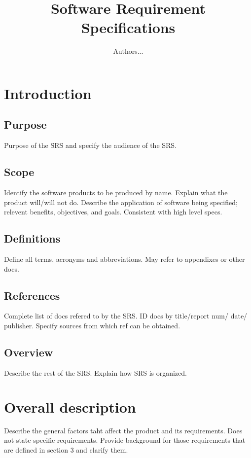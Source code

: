\documentclass[10pt]{article}
\begin{document}
\title{Software Requirement Specifications}
\author{Authors...}
\date{}
\maketitle

\section{Introduction}
     \subsection{Purpose}
     Purpose of the SRS and specify the audience of the SRS.

     \subsection{Scope}
     Identify the software products to be produced by name. Explain what the product will/will not do. Describe the application of software being specified; relevent benefits, objectives, and goals. Consistent with high level specs.

     \subsection{Definitions}
     Define all terms, acronyms and abbreviations. May refer to appendixes or other docs.

     \subsection{References}
     Complete list of docs refered to by the SRS. ID docs by title/report num/ date/ publisher. Specify sources from which ref can be obtained.

     \subsection{Overview}
     Describe the rest of the SRS. Explain how SRS is organized.

\section{Overall description}
Describe the general factors taht affect the product and its requirements. Does not state specific requirements. Provide background for those requirements that are defined in section 3 and clarify them.
\end{document}
